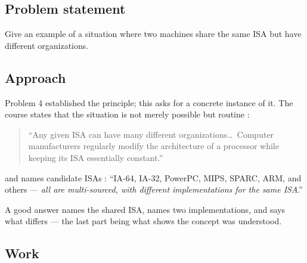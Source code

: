 





\subsection*{Problem statement}

Give an example of a situation where two machines share the same ISA but have
different organizations.

\subsection*{Approach}

Problem 4 established the principle; this asks for a concrete instance of it.
The course states that the situation is not merely possible but routine
:

\begin{quote}
``Any given ISA can have many different organizations\ldots\ Computer
manufacturers regularly modify the architecture of a processor while keeping its
ISA essentially constant.''
\end{quote}

and names candidate ISAs : ``IA-64, IA-32, PowerPC,
MIPS, SPARC, ARM, and others — \emph{all are multi-sourced, with different
implementations for the same ISA}.''

A good answer names the shared ISA, names two implementations, and says what
differs — the last part being what shows the concept was understood.

\subsection*{Work}


